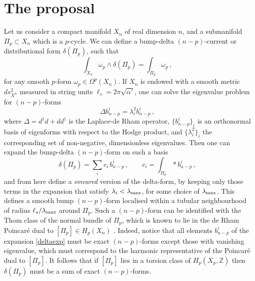 \documentclass[11pt]{article}
\def\a {\alpha}
\def\be{\begin{equation}}
\def\ee{\end{equation}}
\newcommand{\IZ}{\mathbb{Z}}
\begin{document}

\section{The proposal}
\label{s:proposal}

Let us consider a compact manifold $X_n$ of real dimension $n$, and a submanifold $\Pi_p \subset X_n$ which is a $p$-cycle. We can define a bump-delta $(n-p)$-current or distributional form $\delta (\Pi_p)$, such that
\be
\int_{X_n} \omega_p \wedge \delta (\Pi_p) = \int_{\Pi_p} \omega_p \, , 
\label{deltadef}
\ee
for any smooth $p$-form $\omega_p \in \Omega^p (X_n)$. If $X_n$ is endowed with a smooth metric $ds^2_{X^n}$ measured in string units $\ell_s = 2\pi \sqrt{\a'}$, one can solve the eigenvalue problem for $(n-p)$-forms
\be
\Delta b_{n-p}^i = \lambda_i^2 b_{n-p}^i \, , 
\ee
where $\Delta = d^\dag d + d d^\dag$ is the Laplace-de Rham operator, $\{ b_{n-p}^i\}_i$ is an orthonormal basis of eigenforms with respect to the Hodge product, and $\{\lambda_i^2\}_i$ the corresponding set of non-negative, dimensionless eigenvalues. Then one can expand the bump-delta $(n-p)$-form on such a basis
\be
\delta (\Pi_p) = \sum_i c_i  \, b^i_{n-p}\, , \qquad c_i = \int_{\Pi_p} *  b^i_{n-p}\, ,
\label{deltaexp}
\ee
and from here define a {\em smeared} version of the delta-form, by keeping only those terms in the expansion that satisfy $\lambda_i < \lambda_{\rm max}$, for some choice of $\lambda_{\rm max}$. This  defines a smooth bump $(n-p)$-form localised within a tubular neighbourhood of radius $\ell_s/\lambda_{\rm max}$ around $\Pi_p$. Such a $(n-p)$-form can be identified with the Thom class of the normal bundle of $\Pi_p$, which is known to lie in the de Rham Poincar\'e dual to $[\Pi_p] \in H_p(X_n)$ \cite{Bott1982DifferentialFI}. Indeed, notice that all elements $b^{i}_{n-p}$ of the expansion \eqref{deltaexp} must be exact $(n-p)$-forms except those with vanishing eigenvalue, which must correspond to the harmonic representative of the Poincar\'e dual to $[\Pi_p]$. It follows that if $[\Pi_p]$ lies in a torsion class of $H_p(X_p, \IZ)$ then $\delta(\Pi_p)$ must be a sum of exact $(n-p)$-forms.
\end{document}
